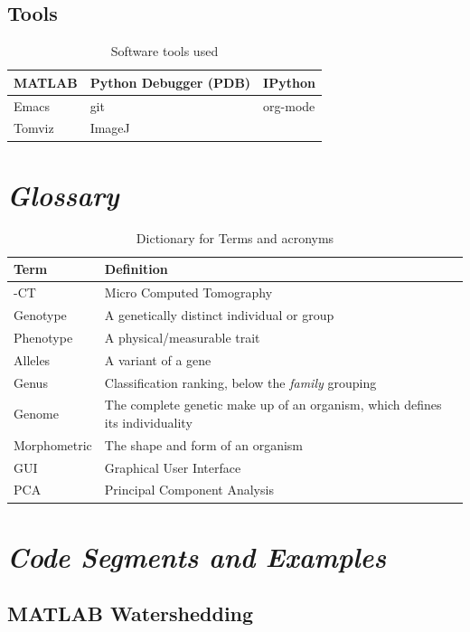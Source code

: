 \documentclass[11pt]{report}
\begin{document}
\subsection{Tools}
\label{sec-7-1-2}
\begin{table}[htb]
\caption{\label{tab:softwareused}Software tools used}
\centering
\begin{tabularx}{\textwidth}{|X|X|X|}
\hline
MATLAB & Python Debugger (PDB) & IPython\\
\hline
Emacs & git & org-mode\\
\hline
Tomviz & ImageJ & \\
\hline
\end{tabularx}
\end{table}

\section{\emph{Glossary}}
\label{sec-7-2}
\begin{table}[htb]
\caption{\label{tab:glossary}Dictionary for Terms and acronyms}
\centering
\begin{tabularx}{\textwidth}{|l|X|}
\hline
\textbf{Term} & \textbf{Definition}\\
\hline
\textmu{}-CT & Micro Computed Tomography\\
\hline
Genotype & A genetically distinct individual or group\\
\hline
Phenotype & A physical/measurable trait\\
\hline
Alleles & A variant of a gene\\
\hline
Genus & Classification ranking, below the \emph{family} grouping\\
\hline
Genome & The complete genetic make up of an organism, which defines its individuality\\
\hline
Morphometric & The shape and form of an organism\\
\hline
GUI & Graphical User Interface\\
\hline
PCA & Principal Component Analysis\\
\hline
\end{tabularx}
\end{table}


\section{\emph{Code Segments and Examples}}
\label{sec-7-3}
\subsection{MATLAB Watershedding}
\label{sec-7-3-1}
\end{document}
